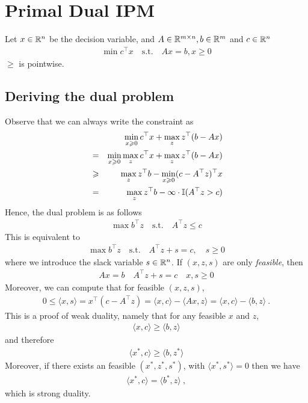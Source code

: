 \section{Primal Dual IPM}

Let $x \in \mathbb{R}^n$ be the decision variable, and $A \in \mathbb{R}^{m \times n},b \in \mathbb{R}^m$ and $c \in \mathbb{R}^n$
\begin{eqnarray}
\min c^\top x \quad \text{s.t.}\quad Ax = b, x \ge 0 
\end{eqnarray}
$\ge$ is pointwise.

\subsection{Deriving the dual problem}
Observe that we can always write the constraint as 
\begin{eqnarray}
&& \min_{x \geqslant 0 } c^\top x + \max_{z} z^{\top}(b-Ax) \\
&=& \min_{x \geqslant 0} \max_{z} c^\top x + \max_{z} z^{\top}(b-Ax) \\
&\geqslant& \max_{z} z^{\top}b - \min_{x \geqslant 0} (c - A^{\top}z)^{\top}x\\
&=& \max_{z} z^{\top}b  - \infty \cdot \mathbb I(A^{\top}z > c)\\
\end{eqnarray}
Hence, the dual problem is as follows
\begin{eqnarray*}
\max b^\top z \quad \text{s.t.}\quad A^{\top} z \le c
\end{eqnarray*}
This is equivalent to 
\begin{eqnarray}
\max b^\top z \quad \text{s.t.}\quad A^{\top} z + s = c, \quad s \ge 0
\end{eqnarray}
where we introduce the slack variable $s \in \mathbb{R}^n$. If $(x,z,s)$ are only \emph{feasible}, then 
\begin{eqnarray}
Ax = b \quad A^{\top} z + s = c \quad x,s \ge 0
\end{eqnarray}
Moreover, we can compute that for feasible $(x,z,s)$,
\begin{eqnarray}
0 \le \langle x, s \rangle = x^{\top}(c - A^{\top}z) = \langle x, c \rangle - \langle Ax, z \rangle = \langle x, c \rangle - \langle b,z \rangle~.
\end{eqnarray}
This is a proof of weak duality, namely that for any feasible $x$ and $z$,
\begin{eqnarray}
\langle x, c \rangle  \ge \langle b,z \rangle
\end{eqnarray}
and therefore
\begin{eqnarray}
\langle x^*, c \rangle  \ge \langle b,z^* \rangle
\end{eqnarray}
Moreover, if there exists an feasible $(x^*,z^*,s^*)$, with $\langle x^*, s^* \rangle = 0$ then we have 
\begin{eqnarray}
\langle x^*, c \rangle = \langle b^*,z \rangle~,
\end{eqnarray}
which is strong duality. 


